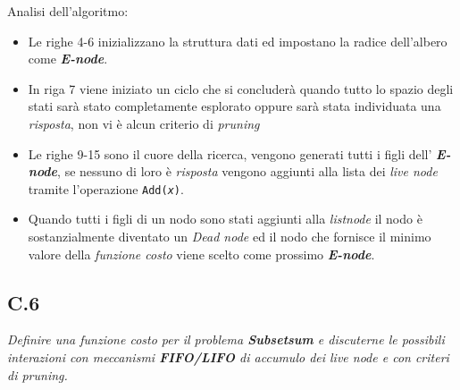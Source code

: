 \documentclass[a4paper]{article}
\newcommand{\imp}[1]{\textbf{\textit{#1}}}
\begin{document}
Analisi dell'algoritmo:
\begin{itemize}
	\item Le righe 4-6 inizializzano la struttura dati ed impostano la radice dell'albero come \imp{E-node}.
	\item In riga 7 viene iniziato un ciclo che si concluderà quando tutto lo spazio degli stati sarà stato completamente esplorato oppure sarà stata individuata una \textit{risposta}, non vi è alcun criterio di \textit{pruning}
	\item Le righe 9-15 sono il cuore della ricerca, vengono generati tutti i figli dell' \imp{E-node}, se nessuno di loro è \textit{risposta} vengono aggiunti alla lista dei \textit{live node} tramite l'operazione \texttt{Add(\textit{x})}. %
	\item Quando tutti i figli di un nodo sono stati aggiunti alla \textit{listnode} il nodo è sostanzialmente diventato un \textit{Dead node} ed il nodo che fornisce il minimo valore della \textit{funzione costo} viene scelto come prossimo \imp{E-node}.
\end{itemize}
\subsection{C.6}
\label{SEC:C6}
\emph{Definire una funzione costo per il problema \textbf{Subsetsum} e discuterne le possibili interazioni con meccanismi \textbf{FIFO/LIFO} di accumulo dei live node e con criteri di pruning.}
\end{document}
